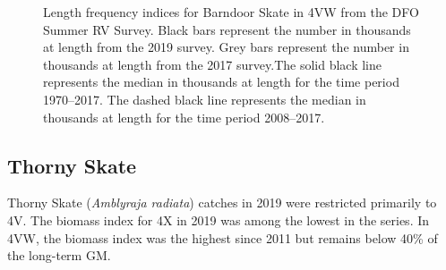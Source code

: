 \documentclass[11pt]{book}
\begin{document}
\begin{figure}[htb]

{\centering {} 

}

\caption{Length frequency indices for Barndoor Skate in 4VW from the DFO Summer RV Survey. Black bars represent the number in thousands at length from the 2019 survey. Grey bars represent the number in thousands at length from the 2017 survey.The solid black line represents the median in thousands at length for the time period 1970--2017. The dashed black line represents the median in thousands at length for the time period 2008--2017.}\label{fig:84-fig-barndoorskate-lengthfreq4VW}
\end{figure}
\clearpage

\hypertarget{thorny-skate}{%
\subsection{Thorny Skate}\label{thorny-skate}}

Thorny Skate (\emph{Amblyraja radiata}) catches in 2019 were restricted primarily to 4V. The biomass index for 4X in 2019 was among the lowest in the series. In 4VW, the biomass index was the highest since 2011 but remains below 40\% of the long-term GM.
\end{document}
